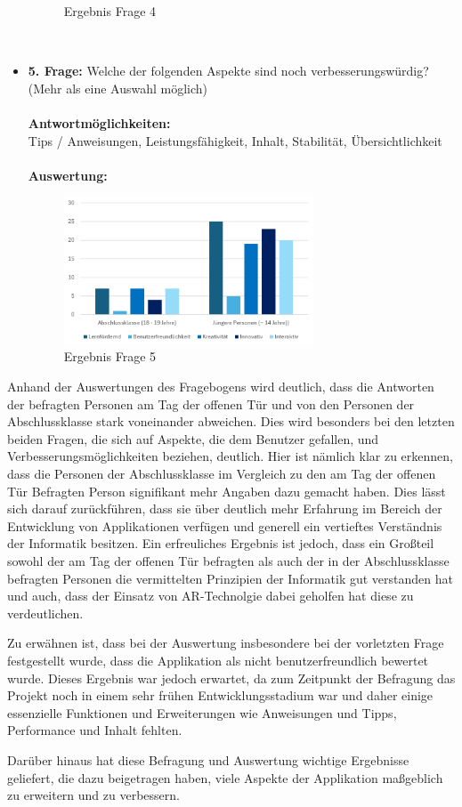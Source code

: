 \begin{itemize}
\begin{figure}[H]
        \caption{Ergebnis Frage 4}
        \label{fig:fr1}
    \end{figure}
    \\
    \item \textbf{5. Frage:} Welche der folgenden Aspekte sind noch verbesserungswürdig? (Mehr als eine Auswahl möglich)
    \\
    \\
    \textbf{Antwortmöglichkeiten:}\\
    Tips / Anweisungen, Leistungsfähigkeit, Inhalt, Stabilität, Übersichtlichkeit
    \\
    \\
    \textbf{Auswertung:}
    \begin{figure}[H]
        \centering
        \includegraphics[width=0.7\textwidth]{images/AuswertungFrage4}
        \caption{Ergebnis Frage 5}
        \label{fig:fr1}
    \end{figure}
\end{itemize}

Anhand der Auswertungen des Fragebogens wird deutlich, dass die Antworten der befragten Personen am Tag der offenen Tür
und von den Personen der Abschlussklasse stark voneinander abweichen. Dies wird besonders bei den letzten beiden Fragen,
die sich auf Aspekte, die dem Benutzer gefallen, und Verbesserungsmöglichkeiten beziehen, deutlich. Hier ist nämlich klar
zu erkennen, dass die Personen der Abschlussklasse im Vergleich zu den am Tag der offenen Tür Befragten Person signifikant
mehr Angaben dazu gemacht haben. Dies lässt sich darauf zurückführen, dass sie über deutlich mehr Erfahrung im Bereich
der Entwicklung von Applikationen verfügen und generell ein vertieftes Verständnis der Informatik besitzen. Ein erfreuliches
Ergebnis ist jedoch, dass ein Großteil sowohl der am Tag der offenen Tür befragten als auch der in der Abschlussklasse
befragten Personen die vermittelten Prinzipien der Informatik gut verstanden hat und auch, dass der Einsatz von AR-Technolgie
dabei geholfen hat diese zu verdeutlichen.

Zu erwähnen ist, dass bei der Auswertung insbesondere bei der vorletzten Frage festgestellt wurde, dass die Applikation
als nicht benutzerfreundlich bewertet wurde. Dieses Ergebnis war jedoch erwartet, da zum Zeitpunkt der Befragung das
Projekt noch in einem sehr frühen Entwicklungsstadium war und daher einige essenzielle Funktionen und Erweiterungen wie
Anweisungen und Tipps, Performance und Inhalt fehlten.

Darüber hinaus hat diese Befragung und Auswertung wichtige Ergebnisse geliefert, die dazu beigetragen haben, viele Aspekte
der Applikation maßgeblich zu erweitern und zu verbessern.